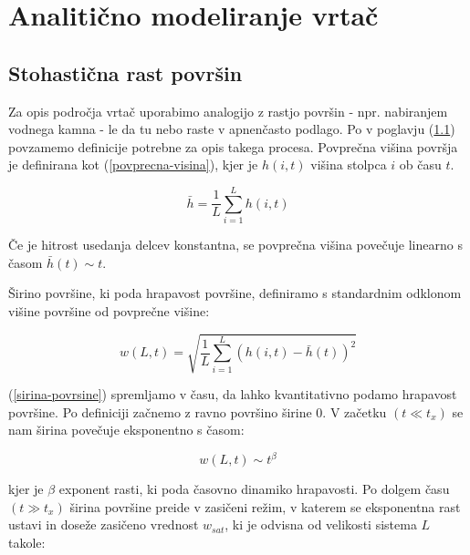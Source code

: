 \documentclass[a4paper, twoside, 12pt]{book}
\begin{document}
        \chapter{Analitično modeliranje vrtač}
        \label{analiticno-modeliranje}

        \section{Stohastična rast površin}
        \label{definicije}

        Za opis področja vrtač uporabimo analogijo z rastjo površin - npr. nabiranjem vodnega kamna - le da tu nebo raste v apnenčasto podlago.
        Po \cite{barabasi1995fractal} v poglavju (\ref{definicije}) povzamemo definicije potrebne za opis takega procesa.
        Povprečna višina površja je definirana kot (\ref{povprecna-visina}), kjer je $h(i,t)$ višina stolpca $i$ ob času $t$.

        \begin{equation}
          \bar{h} = \frac{1}{L} \sum_{i=1}^L h(i,t)
          \label{povprecna-visina}
        \end{equation}

        Če je hitrost usedanja delcev konstantna, se povprečna višina povečuje linearno s časom $\bar{h}(t) \sim t$.

        Širino površine, ki poda hrapavost površine, definiramo s standardnim odklonom višine površine od povprečne višine:

        \begin{equation}
          w(L,t) = \sqrt{\frac{1}{L} \sum_{i=1}^L (h(i,t)-\bar{h}(t))^2}
          \label{sirina-povrsine}
        \end{equation}

        (\ref{sirina-povrsine}) spremljamo v času, da lahko kvantitativno podamo hrapavost površine. Po definiciji začnemo z ravno površino širine 0. V začetku $(t \ll t_x)$ se nam širina povečuje eksponentno s časom:

        \begin{equation}
          w(L,t) \sim t^\beta
          \label{beta}
        \end{equation}

        kjer je $\beta$ exponent rasti, ki poda časovno dinamiko hrapavosti.
        Po dolgem času $(t \gg t_x)$ širina površine preide v zasičeni režim, v katerem se eksponentna rast ustavi in doseže zasičeno vrednost $w_{sat}$, ki je odvisna od velikosti sistema $L$ takole:
\end{document}
